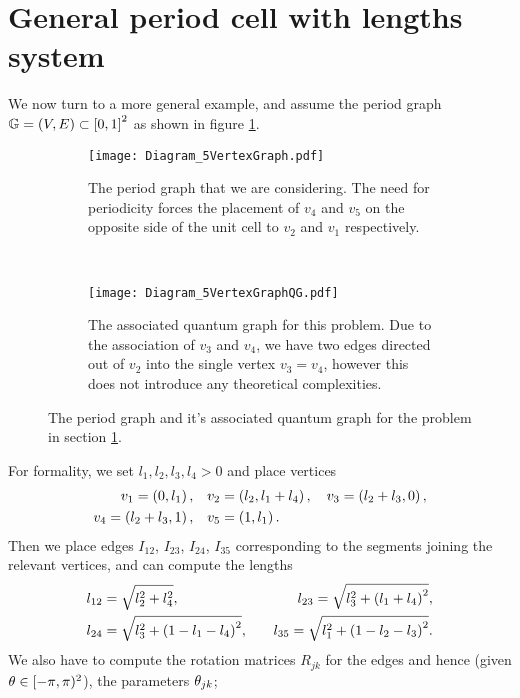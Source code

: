 \section{General period cell with lengths system} \label{sec:ExampleGeneralLengths}
We now turn to a more general example, and assume the period graph $\mathbb{G}=\left( V,E \right)\subset\left[ 0,1 \right]^2$ as shown in figure \ref{fig:Diagram_5VertexGraph}.
\begin{figure}[b!]
	\begin{subfigure}[b]{0.45\textwidth}
		\centering
		\texttt{[image: Diagram\_5VertexGraph.pdf]}
		\caption{\label{fig:Diagram_5VertexGraph} The period graph that we are considering. The need for periodicity forces the placement of $v_4$ and $v_5$ on the opposite side of the unit cell to $v_2$ and $v_1$ respectively.}
	\end{subfigure}
	~
	\begin{subfigure}[b]{0.45\textwidth}
		\centering
		\texttt{[image: Diagram\_5VertexGraphQG.pdf]}
		\caption{\label{fig:Diagram_5VertexGraphQG} The associated quantum graph for this problem. Due to the association of $v_3$ and $v_4$, we have two edges directed out of $v_2$ into the single vertex $v_3=v_4$, however this does not introduce any theoretical complexities.}
	\end{subfigure}
	\caption{\label{fig:GeneralLengthsDiagrams} The period graph and it's associated quantum graph for the problem in section \ref{sec:ExampleGeneralLengths}. }
\end{figure}
For formality, we set $l_1,l_2,l_3,l_4>0$ and place vertices
\begin{align*}
	v_1 = \left( 0,l_1 \right), &\quad v_2 = \left( l_2,l_1+l_4 \right), \quad v_3 = \left( l_2+l_3, 0 \right), \\
	v_4 = \left( l_2+l_3, 1 \right), &\quad v_5 = \left( 1, l_1 \right).
\end{align*}
Then we place edges $I_{12}$, $I_{23}$, $I_{24}$, $I_{35}$ corresponding to the segments joining the relevant vertices, and can compute the lengths
\begin{align*}
	l_{12} &= \sqrt{l_2^2 + l_4^2}, &\quad l_{23} = \sqrt{l_3^2+\left( l_1+l_4 \right)^2}, \\
	l_{24} &= \sqrt{l_3^2 + \left( 1-l_1-l_4 \right)^2}, &\quad l_{35} = \sqrt{l_1^2+\left( 1-l_2-l_3 \right)^2}.
\end{align*}
We also have to compute the rotation matrices $R_{jk}$ for the edges and hence (given $\theta\in[-\pi,\pi)^2$), the parameters $\theta_{jk}$;
